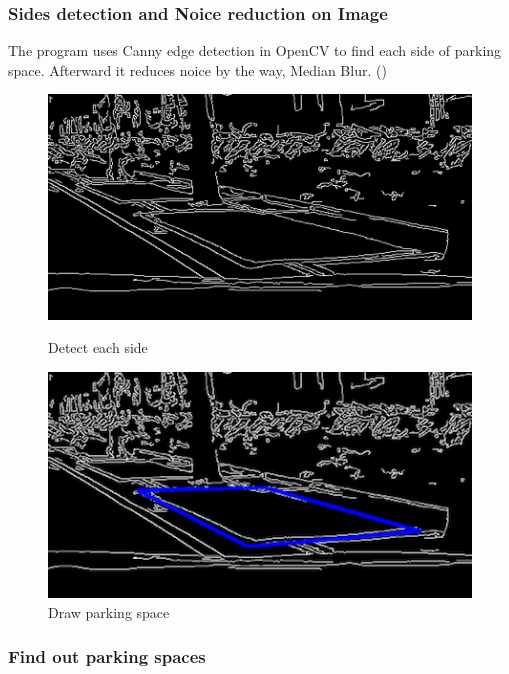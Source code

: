 \documentclass[runningheads,a4paper]{llncs}
\begin{document}
\begin{CJK}{UTF8}{bsmi}
\subsubsection{Sides detection and Noice reduction on Image} 

The program uses Canny edge detection in OpenCV to find each side of
parking space. Afterward it reduces noice by the way, Median Blur.
()

\begin{figure}
	\begin{minipage}{.4\textwidth}
		\centering
		\includegraphics[scale=0.7]{Figures/sideDetecting.png}
		\caption{Detect each side}
		\label{sideDetecting}
	\end{minipage}
	\hspace{0.5in}
	\begin{minipage}{.4\textwidth}
		\centering
		\includegraphics[scale=0.7]{Figures/drawParkingSpace.png}
		\caption{Draw parking space}
		\label{drawParkingSpace}
	\end{minipage}
\end{figure}

\subsubsection{Find out parking spaces}


\end{CJK}
\end{document}
